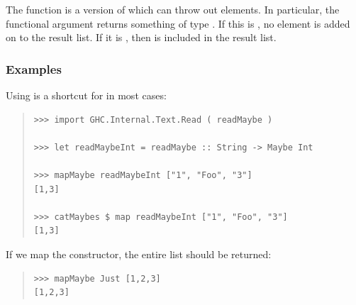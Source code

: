 \begin{haddockdesc}
\item[\begin{tabular}{@{}l}
mapMaybe :: (a -> Maybe b) -> {\char 91}a{\char 93} -> {\char 91}b{\char 93}
\end{tabular}]
{\haddockbegindoc
The  function is a version of  which can throw
 out elements.  In particular, the functional argument returns
 something of type .  If this is , no element
 is added on to the result list.  If it is , then  is
 included in the result list.\par
\subsubsection*{\textbf{Examples}}
Using  is a shortcut for 
 in most cases:\par
\begin{quote}
{\haddockverb\begin{verbatim}
>>> import GHC.Internal.Text.Read ( readMaybe )

>>> let readMaybeInt = readMaybe :: String -> Maybe Int

>>> mapMaybe readMaybeInt ["1", "Foo", "3"]
[1,3]

>>> catMaybes $ map readMaybeInt ["1", "Foo", "3"]
[1,3]

\end{verbatim}}
\end{quote}
If we map the  constructor, the entire list should be returned:\par
\begin{quote}
{\haddockverb\begin{verbatim}
>>> mapMaybe Just [1,2,3]
[1,2,3]

\end{verbatim}}
\end{quote}}
\end{haddockdesc}
